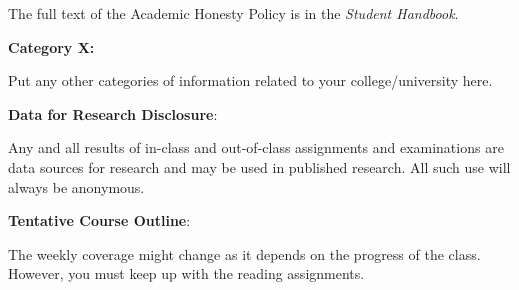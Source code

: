 \documentclass[11pt]{article}
\begin{document}
The full text of the Academic Honesty Policy is in the \emph{Student Handbook}.

\textbf {\large Category X:}

\hspace{3mm}
\hangindent=5mm Put any other categories of information related to your college/university here. \

\textbf {\large Data for Research Disclosure}:

Any and all results of in-class and out-of-class assignments and examinations are data sources for research and may be used in published research. All such use will always be anonymous.

\newpage

\textbf {\large Tentative Course Outline}:

The weekly coverage might change as it depends on the progress of the class.  However, you must keep up with the reading assignments.
\end{document}

